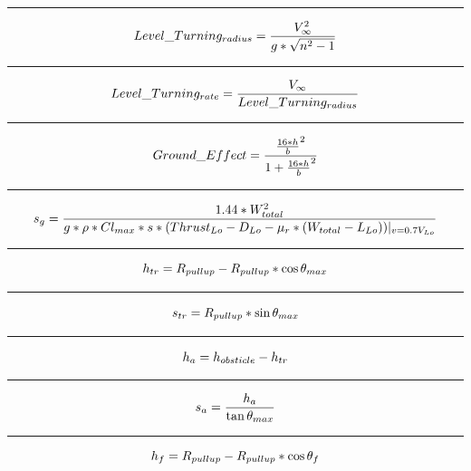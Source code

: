 \documentclass[12pt,A4paper]{article}
\begin{document}
		\hrule
		\vspace{0.1 in}
		\vspace{0.1 in}
		\begin{equation}
			Level\_Turning_{radius} = \frac{V_\infty^2}{g*\sqrt{n^2-1}} \\
		\end{equation}
		\hrule
		\vspace{0.1 in}
		\begin{equation}
			Level\_Turning_{rate} = \frac{V_\infty}{Level\_Turning_{radius}} \\
		\end{equation}
		\hrule
		\vspace{0.1 in}
		\begin{equation}
			Ground\_Effect = \frac{{\frac{16 * h}{b}}^2}{1+{\frac{16 * h}{b}}^2} \\
		\end{equation}
		\hrule
		\vspace{0.1 in}
		\begin{equation}
			s_g = \frac{1.44*W_{total}^2}{g*\rho*Cl_{max}* s * {(Thrust_{Lo} - D_{Lo} - \mu_r*(W_{total}-L_{Lo}))} |_{v=0.7V_{Lo}}} \\
		\end{equation}
		\hrule
		\vspace{0.1 in}
		\begin{equation}
			h_{tr} = R_{pullup} - R_{pullup} * \cos{\theta_{max}} \\
		\end{equation}
		\hrule
		\vspace{0.1 in}
		\begin{equation}
			s_{tr} = R_{pullup} * \sin{\theta_{max}} \\
		\end{equation}
		\hrule
		\vspace{0.1 in}
		\begin{equation}
			h_a = h_{obsticle} - h_{tr} \\
		\end{equation}
		\hrule
		\vspace{0.1 in}
		\begin{equation}
			s_a = \frac{h_a}{\tan{\theta_{max}}} \\
		\end{equation}
		\hrule
		\vspace{0.1 in}
		\begin{equation}
			h_f = R_{pull up} - R_{pull up} * \cos{\theta_f}\\
		\end{equation}
\end{document}

